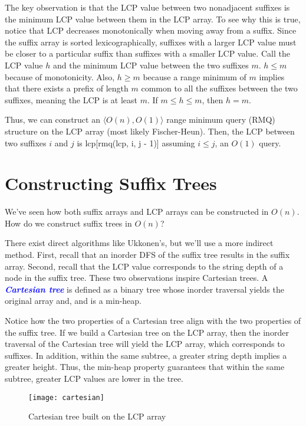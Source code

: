 \documentclass[11pt, oneside]{article}
\newcommand{\emphasis}[1]{\textcolor{blue}{\textbf{\textit{#1}}}}
\begin{document}
The key observation is that the LCP value between two nonadjacent suffixes
is the minimum LCP value between them in the LCP array.
To see why this is true, notice that LCP decreases monotonically when moving away from a suffix.
Since the suffix array is sorted lexicographically, suffixes with a larger LCP
value must be closer to a particular suffix than suffixes with a smaller LCP value.
Call the LCP value \( h \) and the minimum LCP value between the two suffixes \( m \).
\( h \leq m \) because of monotonicity.
Also, \( h \geq m \) because a range minimum of \( m \) implies that there exists a prefix of length \( m \)
common to all the suffixes between the two suffixes, meaning the LCP is at least \( m \).
If \( m \leq h \leq m \), then \( h = m \).

Thus, we can construct an \( \langle O(n), O(1) \rangle \) range minimum query (RMQ) structure
on the LCP array (most likely Fischer-Heun).
Then, the LCP between two suffixes \( i \) and \( j \) is lcp[rmq(lcp, i, j - 1)] assuming \( i \leq j \), an \( O(1) \) query.

\section{Constructing Suffix Trees}

We've seen how both suffix arrays and LCP arrays can be constructed in \( O(n) \). \\
How do we construct suffix trees in \( O(n) \)?

There exist direct algorithms like Ukkonen’s, but we'll use a more indirect method.
First, recall that an inorder DFS of the suffix tree results in the suffix array.
Second, recall that the LCP value corresponds to the string depth of a node in the suffix tree.
These two observations inspire Cartesian trees.
A \emphasis{Cartesian tree} is defined as a binary tree whose inorder traversal yields the original array and, and is a min-heap.

Notice how the two properties of a Cartesian tree align with the two properties of the suffix tree.
If we build a Cartesian tree on the LCP array, then the inorder traversal of the Cartesian tree
will yield the LCP array, which corresponds to suffixes.
In addition, within the same subtree, a greater string depth implies a greater height.
Thus, the min-heap property guarantees that within the same subtree, greater LCP values are lower in the tree.
\newpage
\begin{figure}[h!]
\centering
\texttt{[image: cartesian]}
\caption{Cartesian tree built on the LCP array}
\end{figure}
\end{document}
